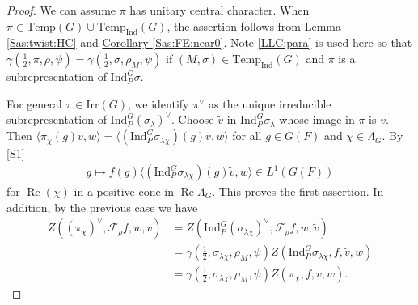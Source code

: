 \documentclass[10pt]{amsart}
\theoremstyle{definition}
\numberwithin{equation}{section}
\numberwithin{equation}{subsection}
\newcommand{\Ind}{\mathrm{Ind}}
\newcommand{\Temp}{\mathrm{Temp}}
\renewcommand{\Re}{\mathop{\mathrm{Re}}}
\begin{document}
\begin{proof}
    We can assume $\pi$ has unitary central character. When $\pi\in\Temp(G)\cup\Temp_\Ind(G)$, the assertion follows from \hyperref[Sas:twist:HC]{Lemma \ref{Sas:twist:HC}} and \hyperref[Sas:FE:near0]{Corollary \ref{Sas:FE:near0}}. Note \eqref{LLC:para} is used here so that $\gamma(\tfrac{1}{2},\pi,\rho,\psi) = \gamma(\tfrac{1}{2},\sigma,\rho_M,\psi)$ if $(M,\sigma)\in\widetilde{\Temp}_\Ind(G)$ and $\pi$ is a subrepresentation of $\Ind_P^G\sigma$. 
    

 For general $\pi\in\mathrm{Irr}(G)$,  we identify $\pi^\lor$ as the unique irreducible subrepresentation of $\mathrm{Ind}_P^G(\sigma_\lambda)^\lor$. Choose $\tilde{v}$ in $\mathrm{Ind}_P^G \sigma_\lambda$ whose image in $\pi$ is $v$. Then $\langle \pi_\chi(g)v,w\rangle=\langle (\Ind_{P}^G \sigma_{\lambda \chi})(g)\tilde{v},w\rangle$ for all $g\in G(F)$ and $\chi\in \Lambda_G$. By \eqref{S1}
    \begin{align*}
        g\mapsto  f(g)\langle(\Ind_P^G\sigma_{\lambda\chi})(g)\tilde{v},w\rangle \in L^1(G(F))
    \end{align*}
    for $\Re(\chi)$ in a positive cone in $\Re \Lambda_G$. This proves the first assertion. In addition, by the previous case we have
    \begin{align*}
        Z((\pi_\chi)^\lor,\mathcal{F}_\rho f,w,v) &= Z(\Ind_P^G(\sigma_{\lambda\chi})^\vee,\mathcal{F}_\rho f,w,\tilde{v})\\
        &=\gamma(\tfrac{1}{2},\sigma_{\lambda\chi},\rho_M,\psi)Z(\Ind_P^G\sigma_{\lambda\chi},f,\tilde{v},w)\\
        &=\gamma(\tfrac{1}{2},\sigma_{\lambda\chi},\rho_M,\psi)Z(\pi_\chi,f,v,w).
    \end{align*}
\end{proof}
\end{document}
